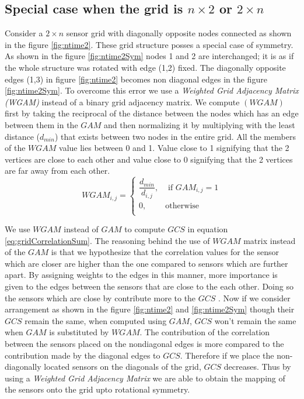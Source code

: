 \subsection{Special case when the grid is $n \times 2$ or $2 \times n$}
Consider a $2 \times n$ sensor grid with diagonally opposite nodes connected as shown in the figure \ref{fig:ntime2}. These grid structure posses a special case of symmetry. As shown in the  figure \ref{fig:ntime2Sym} nodes 1 and 2 are interchanged; it is as if the whole structure was rotated with  edge (1,2) fixed. The diagonally opposite edges (1,3) in figure \ref{fig:ntime2} becomes non diagonal edges in the figure \ref{fig:ntime2Sym}. To overcome this error we use a \textit{Weighted Grid Adjacency Matrix (WGAM)} instead of a binary grid adjacency matrix. We compute $(WGAM)$ first by taking the reciprocal of the distance between the nodes which has an edge between them in the $GAM$ and then normalizing it by multiplying with the least distance ($d_{min}$) that exists between two nodes in the entire grid. All the members of the $WGAM$ value lies between 0 and 1. Value close to 1 signifying that the 2 vertices are close to each other and value close to 0 signifying that the 2 vertices are far away from each other.\\
\begin{equation}
WGAM_{i,j} = 
\begin{cases}
\dfrac{d_{min}}{d_{i,j}}, &\text{ if } GAM_{i,j} = 1\\
0, & \text{otherwise}\\
\end{cases}
\end{equation}

We use $WGAM$ instead of $GAM$ to compute $GCS$ in equation \ref{eq:gridCorrelationSum}. The reasoning behind the use of $WGAM$ matrix instead of the $GAM$ is that we hypothesize that the correlation values for the sensor which are closer are higher than the one compared to sensors which are further apart. By assigning weights to the edges in this manner, more importance is given to the edges between the sensors that are close to the each other. Doing so the sensors which are close by contribute  more to the $GCS$ . 
Now if we consider arrangement as shown in the figure \ref{fig:ntime2} and \ref{fig:ntime2Sym} though their $GCS$ remain the same, when computed using $GAM$, $GCS$ won't remain the same when $GAM$ is substituted by $WGAM$. The contribution of the correlation between the sensors placed on the nondiagonal edges is more compared to the contribution made by the diagonal edges to $GCS$. Therefore if we place the non-diagonally located sensors on the diagonals of the grid, $GCS$ decreases. Thus by using a \textit{Weighted Grid Adjacency Matrix} we are able to obtain the mapping of the sensors onto the grid upto rotational symmetry.

